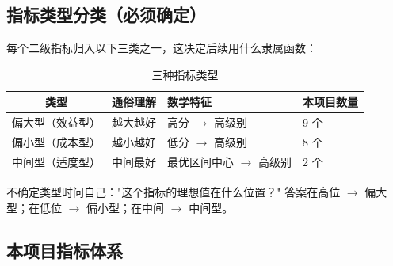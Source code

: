 \documentclass[a4paper,11pt]{ctexart}
\begin{document}
\subsection{指标类型分类（必须确定）}

每个二级指标归入以下三类之一，这决定后续用什么隶属函数：

\begin{table}[H]
\centering
\caption{三种指标类型}
\begin{tabular}{clll}
\toprule
\textbf{类型} & \textbf{通俗理解} & \textbf{数学特征} & \textbf{本项目数量} \\
\midrule
偏大型（效益型） & 越大越好 & 高分 $\to$ 高级别 & 9 个 \\
偏小型（成本型） & 越小越好 & 低分 $\to$ 高级别 & 8 个 \\
中间型（适度型） & 中间最好 & 最优区间中心 $\to$ 高级别 & 2 个 \\
\bottomrule
\end{tabular}
\end{table}

\begin{tipbox}
不确定类型时问自己："这个指标的理想值在什么位置？"
答案在高位 $\to$ 偏大型；在低位 $\to$ 偏小型；在中间 $\to$ 中间型。
\end{tipbox}

\subsection{本项目指标体系}
\end{document}
